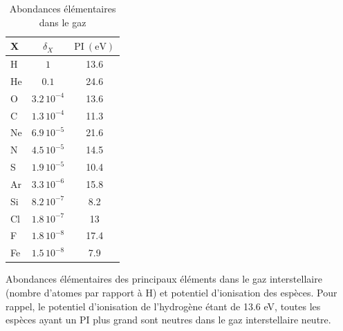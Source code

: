 \begin{table}[!h]
    \centering
    \begin{tabular}{|l|c|c|}
    \hline
     X & $\delta_X$ & $\mathrm{PI}\ (\mathrm{eV})$   \\
     \hline
     H    &  $1$          &     13.6   \\
     He   &  $0.1$        &    24.6      \\
     O    &  $3.2\,10^{-4}$ &    13.6    \\
     C    &  $1.3\,10^{-4}$ &    11.3    \\
     Ne   &  $6.9\,10^{-5}$ &    21.6    \\
     N    &  $4.5\,10^{-5}$ &    14.5    \\
     S    &  $1.9\,10^{-5}$ &    10.4    \\
     Ar   &  $3.3\,10^{-6}$ &    15.8    \\
     Si   &  $8.2\,10^{-7}$ &    8.2    \\
     \color{red}Cl  &  \color{red}$1.8\,10^{-7}$ &    \color{red}13    \\
     F    &  $1.8\,10^{-8}$ &    17.4    \\
     Fe   &  $1.5\,10^{-8}$ &    7.9    \\
     \hline
    \end{tabular}
    \caption{Abondances élémentaires dans le gaz}
    \begin{minipage}{\textwidth}
    Abondances élémentaires des principaux éléments dans le gaz interstellaire (nombre d'atomes par rapport à H) et potentiel d'ionisation des espèces. Pour rappel, le potentiel d'ionisation de l'hydrogène étant de 13.6 eV, toutes les espèces ayant un PI plus grand sont neutres dans le gaz interstellaire neutre. 
    \end{minipage}
    \label{tab:gaz}
\end{table}{}

    
